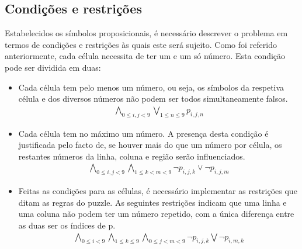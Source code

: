 \documentclass[a4paper,12pt]{article}
\theoremstyle{definition}
\theoremstyle{theorem}
\theoremstyle{remark}
\begin{document}
\subsection{Condições e restrições}
Estabelecidos os símbolos proposicionais, é necessário descrever o problema em
termos de condições e restrições às quais este será sujeito.  Como foi referido
anteriormente, cada célula necessita de ter um e um só número. Esta condição
pode ser dividida em duas:
\begin{itemize}
     \item Cada célula tem pelo menos um número, ou seja, os símbolos da
        respetiva célula e dos diversos números não podem ser todos
        simultaneamente falsos.
        \begin{align}
        \bigwedge_{0\leq i,j < 9}
           \bigvee_{1\leq n \leq 9} p_{i,j,n}
        \end{align}
     
      \item Cada célula tem no máximo um número. A presença desta condição é
        justificada pelo facto de, se houver mais do que um número por célula,
        os restantes números da linha, coluna e região serão influenciados.
        \begin{align}
        \bigwedge_{0\leq i,j < 9}
           \bigwedge_{1\leq k < m < 9}
           {\lnot p_{i,j,k} \lor \lnot p_{i,j,m}}
        \end{align}

      \item Feitas as condições para as células, é necessário implementar as
         restrições que ditam as regras do puzzle.  As seguintes restrições
         indicam que uma linha e uma coluna não podem ter um número repetido,
         com a única diferença entre as duas ser os índices de p.
         \begin{align}
         \bigwedge_{0\leq i < 9} \bigwedge_{1\leq k \leq 9} \bigwedge_{0\leq j < m
         < 9} \lnot p_{i,j,k}
         \bigvee \lnot p_{i,m,k}
         \end{align}


\end{itemize}
\end{document}
